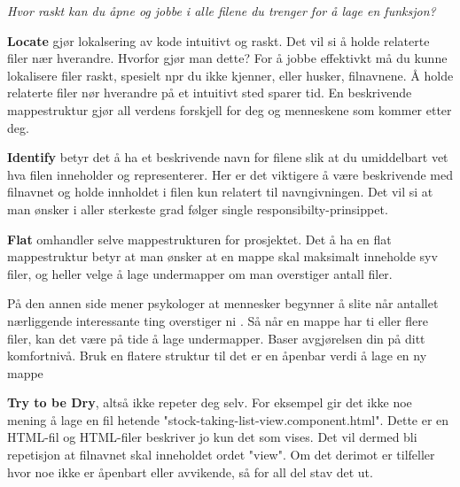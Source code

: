 \textit{Hvor raskt kan du åpne og jobbe i alle filene du trenger for å lage en funksjon? }

\textbf{Locate} gjør lokalsering av kode intuitivt og raskt. Det vil si å holde relaterte filer nær hverandre. Hvorfor gjør man dette? For å jobbe effektivkt må du kunne lokalisere filer raskt, spesielt npr du ikke kjenner, eller husker, filnavnene. Å holde relaterte filer nør hverandre på et intuitivt sted sparer tid. En beskrivende mappestruktur gjør all verdens forskjell for deg og menneskene som kommer etter deg.

\textbf{Identify} betyr det å ha et beskrivende navn for filene slik at du umiddelbart vet hva filen inneholder og representerer. Her er det viktigere å være beskrivende med filnavnet og holde innholdet i filen kun relatert til navngivningen. Det vil si at man ønsker i aller sterkeste grad følger single responsibilty-prinsippet.

\textbf{Flat} omhandler selve mappestrukturen for prosjektet. Det å ha en flat mappestruktur betyr at man ønsker at en mappe skal maksimalt inneholde syv filer, og heller velge å lage undermapper om man overstiger antall filer. 

På den annen side mener psykologer at mennesker begynner å slite når antallet nærliggende interessante ting overstiger ni \cite{miller1956magical}. 
Så når en mappe har ti eller flere filer, kan det være på tide å lage undermapper. Baser avgjørelsen din på ditt komfortnivå. Bruk en flatere struktur til det er en åpenbar verdi å lage en ny mappe

\textbf{Try to be Dry}, altså ikke repeter deg selv. For eksempel gir det ikke noe mening å lage en fil hetende "stock-taking-list-view.component.html". Dette er en HTML-fil og HTML-filer beskriver jo kun det som vises. Det vil dermed bli repetisjon at filnavnet skal inneholdet ordet "view". Om det derimot er tilfeller hvor noe ikke er åpenbart eller avvikende, så for all del stav det ut.

